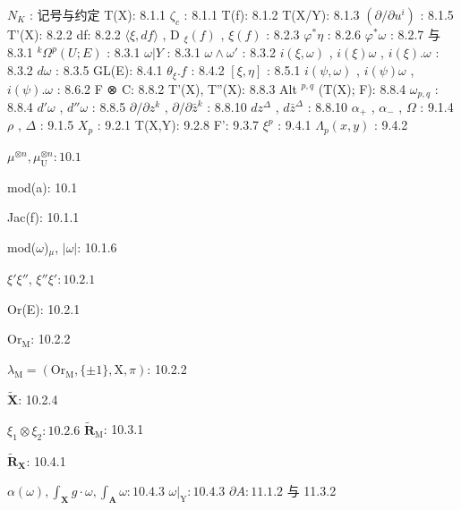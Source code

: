 
\(N_{K}\) : 记号与约定 T(X): 8.1.1 \(\zeta_{c}\) : 8.1.1 T(f): 8.1.2 T(X/Y): 8.1.3 \((\partial/\partial u^{i})\) : 8.1.5 T'(X): 8.2.2 df: 8.2.2 \(\langle\xi, df\rangle\) , D \(_{\xi}(f)\) , \(\xi(f)\) : 8.2.3 \(\varphi^{*}\eta\) : 8.2.6 \(\varphi^{*}\omega\) : 8.2.7 与 8.3.1 \(^{k}\Omega^{p}(U; E)\) : 8.3.1 \(\omega|Y\) : 8.3.1 \(\omega\wedge\omega'\) : 8.3.2 \(i(\xi,\omega)\) , \(i(\xi)\omega\) , \(i(\xi).\omega\) : 8.3.2 \(d\omega\) : 8.3.5 GL(E): 8.4.1 \(\theta_{\xi}.f\) : 8.4.2 \([\xi,\eta]\) : 8.5.1 \(i(\psi,\omega)\) , \(i(\psi)\omega\) , \(i(\psi).\omega\) : 8.6.2 F ⊗ C: 8.8.2 T'(X), T''(X): 8.8.3 Alt \(^{p,q}\) (T(X); F): 8.8.4 \(\omega_{p,q}\) : 8.8.4 \(d'\omega\) , \(d''\omega\) : 8.8.5 \(\partial/\partial z^{k}\) , \(\partial/\partial\bar{z}^{k}\) : 8.8.10 \(dz^{\Delta}\) , \(d\bar{z}^{\Delta}\) : 8.8.10 \(\alpha_{+}\) , \(\alpha_{-}\) , \(\Omega\) : 9.1.4 \(\rho\) , \(\Delta\) : 9.1.5 \(X_{p}\) : 9.2.1 T(X,Y): 9.2.8 F': 9.3.7 \(\xi^{p}\) : 9.4.1 \(\Lambda_{p}(x,y)\) : 9.4.2

\(\mu^{\otimes n}, \mu_{\mathrm{U}}^{\otimes n}: 10.1\)

mod(a): 10.1

Jac(f): 10.1.1

mod(\(\omega\))\(_{\mu}\), \(|\omega|\): 10.1.6

\(\xi'\xi''\), \(\xi''\xi': 10.2.1\)

Or(E): 10.2.1

\(\mathrm{Or}_{\mathrm{M}}\): 10.2.2

\(\lambda_{\mathrm{M}} = (\mathrm{Or}_{\mathrm{M}}, \{\pm 1\}, \mathrm{X}, \pi)\): 10.2.2

\(\tilde{\mathbf{X}}\): 10.2.4

\(\xi_1 \otimes \xi_2: 10.2.6\) \(\tilde{\mathbf{R}}_{\mathrm{M}}\): 10.3.1

\(\tilde{\mathbf{R}}_{\mathbf{X}}\): 10.4.1

\(\alpha(\omega), \int_{\mathbf{X}} g \cdot \omega, \int_{\mathbf{A}} \omega: 10.4.3\) \(\omega|_{\mathrm{Y}}: 10.4.3\) \(\partial A: 11.1.2\) 与 11.3.2

